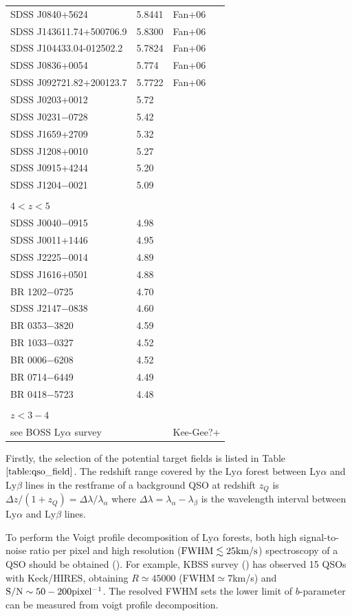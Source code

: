 \documentclass[useAMS,usenatbib,twocolumn]{mn2e}
\newcommand{\LyA}{\mbox{Ly}\alpha}
\begin{document}
\begin{table}
\begin{tabular}{lll}
SDSS J0840+5624                   &  5.8441       & Fan+06  \\
SDSS J143611.74+500706.9          &  5.8300       & Fan+06  \\
SDSS J104433.04-012502.2          &  5.7824       & Fan+06  \\
SDSS J0836+0054                   &  5.774        & Fan+06  \\
SDSS J092721.82+200123.7          &  5.7722       & Fan+06  \\
SDSS J0203+0012  & 5.72 \\
SDSS J0231−0728  & 5.42 \\ 
SDSS J1659+2709  & 5.32 \\
SDSS J1208+0010  & 5.27 \\
SDSS J0915+4244  & 5.20 \\
SDSS J1204−0021  & 5.09 \\
\\
$4<z<5$ \\
SDSS J0040−0915  & 4.98\\
SDSS J0011+1446  & 4.95\\
SDSS J2225−0014  & 4.89\\
SDSS J1616+0501  & 4.88\\
BR 1202−0725     & 4.70\\
SDSS J2147−0838  & 4.60\\
BR 0353−3820     & 4.59\\
BR 1033−0327     & 4.52\\
BR 0006−6208     & 4.52\\
BR 0714−6449     & 4.49\\
BR 0418−5723     & 4.48\\
\\
$z<3-4$ \\
see BOSS $\LyA$ survey & & Kee-Gee?+ \\
  \hline
\end{tabular}

\end{table}

Firstly, the selection of the potential target fields is listed in
Table $\ref{table:qso_field}$. The redshift range covered by the $\LyA$ 
forest between $\LyA$ and $\mbox{Ly}\beta$ lines in the restframe of a 
background QSO at redshift $z_Q$ is $\Delta z/(1+z_Q)=\Delta\lambda/
\lambda_\alpha$ where $\Delta\lambda=\lambda_\alpha-\lambda_\beta$ is the 
wavelength interval between $\LyA$ and $\mbox{Ly}\beta$ lines.

To perform the Voigt profile decomposition of $\LyA$ forests, both high 
signal-to-noise ratio per pixel and high resolution ($\rm{FWHM\lesssim25km/s}$)
spectroscopy of a QSO should be obtained (\citealt{1998ARA&A..36..267R}). 
For example, KBSS survey (\citealt{2012ApJ...750...67R}) has observed 
15 QSOs with Keck/HIRES, obtaining $R\simeq45000$ 
(FWHM$\simeq 7$km/s) and $\rm{S/N\sim50-200pixel^{-1}}$. The resolved FWHM sets 
the lower limit of $b$-parameter can be measured from voigt profile 
decomposition. 
\end{document}
